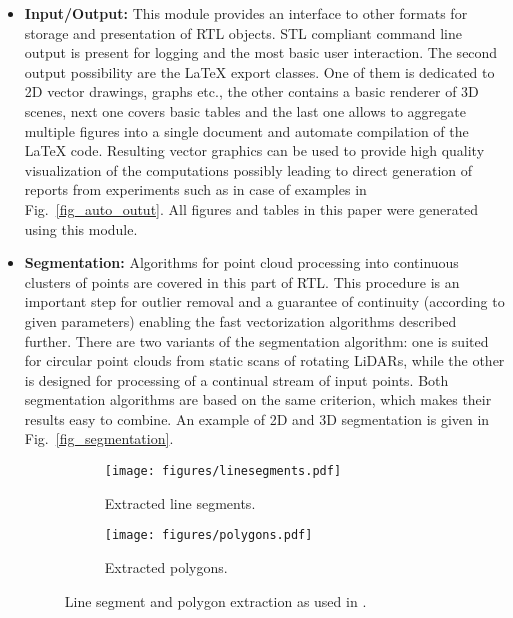 \documentclass[
    letterpaper, 
    10 pt, 
    conference,
    table,
]{ieeeconf}
\begin{document}
\begin{itemize}
    \item \textbf{Input/Output:} This module provides an interface to other formats for storage and presentation of RTL objects. STL compliant command line output is present for logging and the most basic user interaction. The second output possibility are the LaTeX export classes. One of them is dedicated to 2D vector drawings, graphs etc., the other contains a basic renderer of 3D scenes, next one covers basic tables and the last one allows to aggregate multiple figures into a single document and automate compilation of the LaTeX code. Resulting vector graphics can be used to provide high quality visualization of the computations possibly leading to direct generation of reports from experiments such as in case of examples in Fig.~\ref{fig_auto_outut}. All figures and tables in this paper were generated using this module.
    
    \item \textbf{Segmentation:} Algorithms for point cloud processing into continuous clusters of points are covered in this part of RTL. This procedure is an important step for outlier removal and a guarantee of continuity (according to given parameters) enabling the fast vectorization algorithms described further. There are two variants of the segmentation algorithm: one is suited for circular point clouds from static scans of rotating LiDARs, while the other is designed for processing of a continual stream of input points. Both segmentation algorithms are based on the same criterion, which makes their results easy to combine. An example of 2D and 3D segmentation is given in Fig.~\ref{fig_segmentation}.

    \begin{figure*}[t]
        \centering
        \begin{subfigure}{.5\textwidth}
            \centering
            \texttt{[image: figures/linesegments.pdf]}
            \caption{Extracted line segments.}
        \end{subfigure}%
        \begin{subfigure}{.5\textwidth}
            \centering
            \texttt{[image: figures/polygons.pdf]}
            \caption{Extracted polygons.}
        \end{subfigure}
        \caption{Line segment and polygon extraction as used in \cite{Jelinek2019a}.}
        \label{fig_vectorization_examples}
    \end{figure*}
    

\end{itemize}
\end{document}
